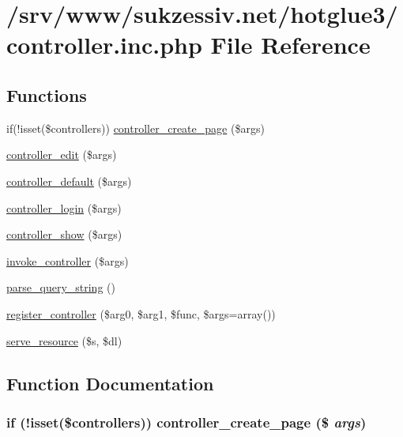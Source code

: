 \hypertarget{controller_8inc_8php}{
\section{/srv/www/sukzessiv.net/hotglue3/controller.inc.php File Reference}
\label{controller_8inc_8php}
}
\subsection*{Functions}
\begin{CompactItemize}
\item 
if(!isset(\$controllers)) \hyperlink{controller_8inc_8php_647d96ea8304771250e8fa4251a4d12e}{controller\_\-create\_\-page} (\$args)
\item 
\hyperlink{controller_8inc_8php_406fb5b2a2a93bef89e4ba46f8829d2f}{controller\_\-edit} (\$args)
\item 
\hyperlink{controller_8inc_8php_e9c67435a37f4b70d0769079c9dbf379}{controller\_\-default} (\$args)
\item 
\hyperlink{controller_8inc_8php_c3e283e26869e2ffd938bdf9775c3e81}{controller\_\-login} (\$args)
\item 
\hyperlink{controller_8inc_8php_d135971740244b9e81718d4cd0407b11}{controller\_\-show} (\$args)
\item 
\hyperlink{controller_8inc_8php_170bef82dc4636c51b678276323e4ff4}{invoke\_\-controller} (\$args)
\item 
\hyperlink{controller_8inc_8php_51a50fbc5165b4ff0a289b2010bb7597}{parse\_\-query\_\-string} ()
\item 
\hyperlink{controller_8inc_8php_543961dbcd309fa2cb6a887a8666bf1c}{register\_\-controller} (\$arg0, \$arg1, \$func, \$args=array())
\item 
\hyperlink{controller_8inc_8php_5d5274c3531eb05a1ea5927ff3cd08d3}{serve\_\-resource} (\$s, \$dl)
\end{CompactItemize}


\subsection{Function Documentation}
\hypertarget{controller_8inc_8php_647d96ea8304771250e8fa4251a4d12e}{
\subsubsection[{controller\_\-create\_\-page}]{\setlength{\rightskip}{0pt plus 5cm}if (!isset(\$controllers)) controller\_\-create\_\-page (\$ {\em args})}}
\label{controller_8inc_8php_647d96ea8304771250e8fa4251a4d12e}


